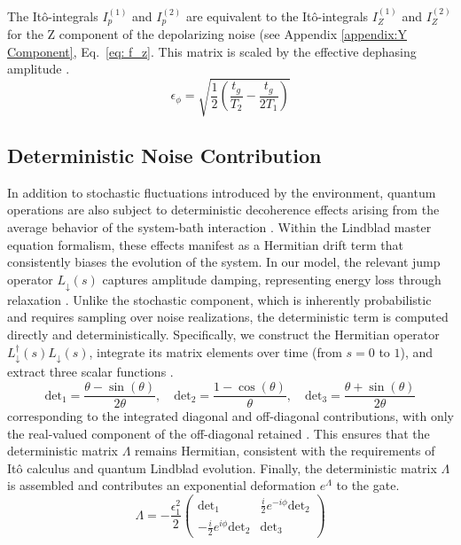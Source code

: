 \documentclass[9pt,a4paper,twocolumn,twoside]{tau-class/tau}
\begin{document}
The Itô-integrals $I_p^{(1)}$ and $I_p^{(2)}$ are equivalent to the Itô-integrals $I_Z^{(1)}$ and $I_Z^{(2)}$ for the Z component of the depolarizing noise (see Appendix \ref{appendix:Y Component}, Eq.~\eqref{eq: f_z}. 
This matrix is scaled by the effective dephasing amplitude \cite{dibartolomeo2023noisy}.
\begin{equation}
    \epsilon_\phi = \sqrt{\frac{1}{2} \left( \frac{t_g}{T_2} - \frac{t_g}{2T_1} \right)}
    \label{eq: e_psi}
\end{equation}

\subsection{Deterministic Noise Contribution}
In addition to stochastic fluctuations introduced by the environment, quantum operations are also subject to deterministic decoherence effects arising from the average behavior of the system-bath interaction \cite{Gu2019}. Within the Lindblad master equation formalism, these effects manifest as a Hermitian drift term that consistently biases the evolution of the system. In our model, the relevant jump operator $L_\downarrow(s)$ captures amplitude damping, representing energy loss through relaxation \cite{dibartolomeo2023noisy}. Unlike the stochastic component, which is inherently probabilistic and requires sampling over noise realizations, the deterministic term is computed directly and deterministically. Specifically, we construct the Hermitian operator $L_\downarrow^\dagger(s)L_\downarrow(s)$, integrate its matrix elements over time (from $s = 0$ to $1$), and extract three scalar functions \cite{quantum_gates_repo}. 
\begin{equation}
\text{det}_1 = \frac{\theta - \sin(\theta)}{2\theta}, \quad
\text{det}_2 = \frac{1 - \cos(\theta)}{\theta}, \quad
\text{det}_3 = \frac{\theta + \sin(\theta)}{2\theta}
\end{equation} 
corresponding to the integrated diagonal and off-diagonal contributions, with only the real-valued component of the off-diagonal retained \cite{dibartolomeo2023noisy}. This ensures that the deterministic matrix \(\Lambda\) remains Hermitian, consistent with the requirements of Itô calculus and quantum Lindblad evolution.
Finally, the deterministic matrix $\Lambda$ is assembled and contributes an exponential deformation $e^\Lambda$ to the gate.
\begin{equation}
    \Lambda = -\frac{\epsilon_1^2}{2} \begin{pmatrix}
\text{det}_1 & \frac{i}{2} e^{-i\phi} \text{det}_2 \\
-\frac{i}{2} e^{i\phi} \text{det}_2 & \text{det}_3
\end{pmatrix}
\end{equation}
\end{document}
